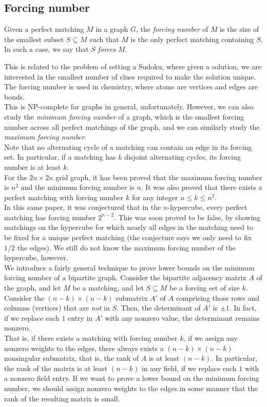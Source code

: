 \subsection{Forcing number}

\begin{fdef}
	Given a perfect matching $M$ in a graph $G$, the \emph{forcing number} of $M$ is the size of the smallest subset $S \subseteq M$ such that $M$ is the only perfect matching containing $S$. In such a case, we say that $S$ \emph{forces} $M$.
\end{fdef}
This is related to the problem of setting a Sudoku, where given a solution, we are interested in the smallest number of clues required to make the solution unique. The forcing number is used in chemistry, where atoms are vertices and edges are bonds.\\
This is \textsf{NP}-complete for graphs in general, unfortunately. However, we can also study the \emph{minimum forcing number} of a graph, which is the smallest forcing number across all perfect matchings of the graph, and we can similarly study the \emph{maximum forcing number}.\\

Note that no alternating cycle of a matching can contain an edge in its forcing set. In particular, if a matching has $k$ disjoint alternating cycles, its forcing number is at least $k$.\\
For the $2n \times 2n$ grid graph, it has been proved that the maximum forcing number is $n^2$ and the minimum forcing number is $n$. It was also proved that there exists a perfect matching with forcing number $k$ for any integer $n \le k \le n^2$.\\
In this same paper, it was conjectured that in the $n$-hypercube, every perfect matching has forcing number $2^{n-2}$. This was soon proved to be false, by showing matchings on the hypercube for which nearly all edges in the matching need to be fixed for a unique perfect matching (the conjecture says we only need to fix $1/2$ the edges). We still do not know the maximum forcing number of the hypercube, however. \\

We introduce a fairly general technique to prove lower bounds on the minimum forcing number of a bipartite graph. Consider the bipartite adjacency matrix $A$ of the graph, and let $M$ be a matching, and let $S \subseteq M$ be a forcing set of size $k$. Consider the $(n-k) \times (n-k)$ submatrix $A'$ of $A$ comprising those rows and columns (vertices) that are \emph{not} in $S$. Then, the determinant of $A'$ is $\pm 1$. In fact, if we replace each $1$ entry in $A'$ with any nonzero value, the determinant remains nonzero.\\
That is, if there exists a matching with forcing number $k$, if we assign any nonzero weights to the edges, there always exists a $(n-k) \times (n-k)$ nonsingular submatrix, that is, the rank of $A$ is at least $(n-k)$. In particular, the rank of the matrix is at least $(n-k)$ in any field, if we replace each $1$ with a nonzero field entry. If we want to prove a lower bound on the minimum forcing number, we should assign nonzero weights to the edges in some manner that the rank of the resulting matrix is small.


